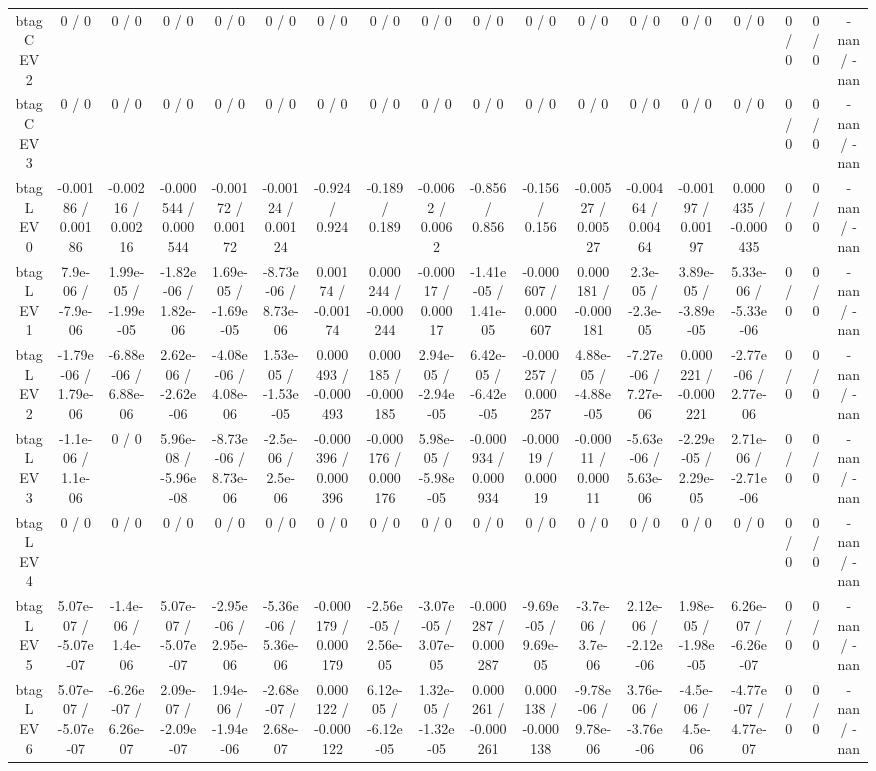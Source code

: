\documentclass[10pt]{article}
\begin{document}
\begin{table}[htbp]
\begin{center}
\begin{tabular}{|c|c|c|c|c|c|c|c|c|c|c|c|c|c|c|c|c|c|}
  btag C EV 2 & 0 / 0 & 0 / 0 & 0 / 0 & 0 / 0 & 0 / 0 & 0 / 0 & 0 / 0 & 0 / 0 & 0 / 0 & 0 / 0 & 0 / 0 & 0 / 0 & 0 / 0 & 0 / 0 & 0 / 0 & 0 / 0 & -nan / -nan \\ 
  btag C EV 3 & 0 / 0 & 0 / 0 & 0 / 0 & 0 / 0 & 0 / 0 & 0 / 0 & 0 / 0 & 0 / 0 & 0 / 0 & 0 / 0 & 0 / 0 & 0 / 0 & 0 / 0 & 0 / 0 & 0 / 0 & 0 / 0 & -nan / -nan \\ 
  btag L EV 0 & -0.00186 / 0.00186 & -0.00216 / 0.00216 & -0.000544 / 0.000544 & -0.00172 / 0.00172 & -0.00124 / 0.00124 & -0.924 / 0.924 & -0.189 / 0.189 & -0.0062 / 0.0062 & -0.856 / 0.856 & -0.156 / 0.156 & -0.00527 / 0.00527 & -0.00464 / 0.00464 & -0.00197 / 0.00197 & 0.000435 / -0.000435 & 0 / 0 & 0 / 0 & -nan / -nan \\ 
  btag L EV 1 & 7.9e-06 / -7.9e-06 & 1.99e-05 / -1.99e-05 & -1.82e-06 / 1.82e-06 & 1.69e-05 / -1.69e-05 & -8.73e-06 / 8.73e-06 & 0.00174 / -0.00174 & 0.000244 / -0.000244 & -0.00017 / 0.00017 & -1.41e-05 / 1.41e-05 & -0.000607 / 0.000607 & 0.000181 / -0.000181 & 2.3e-05 / -2.3e-05 & 3.89e-05 / -3.89e-05 & 5.33e-06 / -5.33e-06 & 0 / 0 & 0 / 0 & -nan / -nan \\ 
  btag L EV 2 & -1.79e-06 / 1.79e-06 & -6.88e-06 / 6.88e-06 & 2.62e-06 / -2.62e-06 & -4.08e-06 / 4.08e-06 & 1.53e-05 / -1.53e-05 & 0.000493 / -0.000493 & 0.000185 / -0.000185 & 2.94e-05 / -2.94e-05 & 6.42e-05 / -6.42e-05 & -0.000257 / 0.000257 & 4.88e-05 / -4.88e-05 & -7.27e-06 / 7.27e-06 & 0.000221 / -0.000221 & -2.77e-06 / 2.77e-06 & 0 / 0 & 0 / 0 & -nan / -nan \\ 
  btag L EV 3 & -1.1e-06 / 1.1e-06 & 0 / 0 & 5.96e-08 / -5.96e-08 & -8.73e-06 / 8.73e-06 & -2.5e-06 / 2.5e-06 & -0.000396 / 0.000396 & -0.000176 / 0.000176 & 5.98e-05 / -5.98e-05 & -0.000934 / 0.000934 & -0.00019 / 0.00019 & -0.00011 / 0.00011 & -5.63e-06 / 5.63e-06 & -2.29e-05 / 2.29e-05 & 2.71e-06 / -2.71e-06 & 0 / 0 & 0 / 0 & -nan / -nan \\ 
  btag L EV 4 & 0 / 0 & 0 / 0 & 0 / 0 & 0 / 0 & 0 / 0 & 0 / 0 & 0 / 0 & 0 / 0 & 0 / 0 & 0 / 0 & 0 / 0 & 0 / 0 & 0 / 0 & 0 / 0 & 0 / 0 & 0 / 0 & -nan / -nan \\ 
  btag L EV 5 & 5.07e-07 / -5.07e-07 & -1.4e-06 / 1.4e-06 & 5.07e-07 / -5.07e-07 & -2.95e-06 / 2.95e-06 & -5.36e-06 / 5.36e-06 & -0.000179 / 0.000179 & -2.56e-05 / 2.56e-05 & -3.07e-05 / 3.07e-05 & -0.000287 / 0.000287 & -9.69e-05 / 9.69e-05 & -3.7e-06 / 3.7e-06 & 2.12e-06 / -2.12e-06 & 1.98e-05 / -1.98e-05 & 6.26e-07 / -6.26e-07 & 0 / 0 & 0 / 0 & -nan / -nan \\ 
  btag L EV 6 & 5.07e-07 / -5.07e-07 & -6.26e-07 / 6.26e-07 & 2.09e-07 / -2.09e-07 & 1.94e-06 / -1.94e-06 & -2.68e-07 / 2.68e-07 & 0.000122 / -0.000122 & 6.12e-05 / -6.12e-05 & 1.32e-05 / -1.32e-05 & 0.000261 / -0.000261 & 0.000138 / -0.000138 & -9.78e-06 / 9.78e-06 & 3.76e-06 / -3.76e-06 & -4.5e-06 / 4.5e-06 & -4.77e-07 / 4.77e-07 & 0 / 0 & 0 / 0 & -nan / -nan \\ 

\end{tabular}
\end{center}
\end{table}
\end{document}
